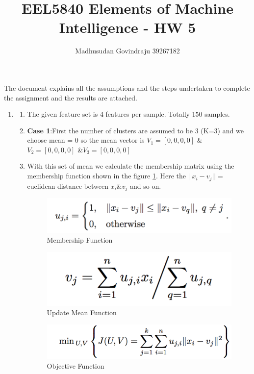 \documentclass[10pt, letterpaper]{article}
\author{Madhusudan Govindraju 39267182 }
\date{}
\begin{document}
\title{EEL5840  Elements of Machine Intelligence - HW 5}
\maketitle

The document explains all the assumptions and the steps undertaken to complete the assignment and the results  are attached.

\begin{enumerate}
\item

\begin{enumerate}
\item The given feature set is 4 features per sample. Totally 150 samples.
\item \textbf{Case 1}:First the number of clusters are assumed to be 3 (K=3) and we choose  mean = 0 so the mean vector is $V_1 = [0,0,0,0]$ \& $V_2 = [0,0,0,0]$ \&$V_3  = [0,0,0,0]$
\item With this set of mean we calculate the membership matrix using the membership function shown in the figure \ref{fig:MembershipFunction}. Here the $||x_i - v_j|| =$euclidean distance between $x_i \& v_j$ and so on.

\begin{figure}[h!]
\centering
\includegraphics[scale = 0.5]{MembershipFunction}
\caption{Membership Function}
\label{fig:MembershipFunction}
\end{figure}

\begin{figure}[h!]
\centering
\includegraphics[scale=0.5]{UpdateMean}
\caption{ Update Mean Function}
\label {fig:UpdateMean}
\end{figure}

\begin{figure}[h!]
\centering
\includegraphics[scale=0.5]{ObjectiveFunction}
\caption{ Objective Function}
\label {fig:ObjectiveFunction}
\end{figure}






\end{enumerate}
\end{enumerate}
\end{document}
